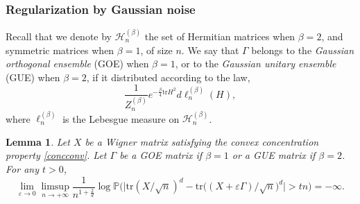 \documentclass[aop,preprint]{imsart}
\newcommand\PP{\mathbb{P}}
\newcommand\tr{\mathrm{tr}}
\newcommand\eps{\varepsilon}
\numberwithin{equation}{section}
\theoremstyle{definition}
\theoremstyle{plain}
\newtheorem{Lem}[Def]{Lemma}
\theoremstyle{remark}
\begin{document}
\subsubsection{Regularization by Gaussian noise}Recall that we denote by $\mathcal{H}_n^{(\beta)}$ the set of Hermitian matrices when $\beta=2 $, and symmetric matrices when $\beta=1$, of size $n$.
We say that $\Gamma$ belongs to the \textit{Gaussian orthogonal ensemble} (GOE) when $\beta=1$, or to the \textit{Gaussian unitary ensemble} (GUE) when $\beta =2$, if it distributed according to the law,
$$ \frac{1}{Z_n^{(\beta)} }e^{-\frac{\beta}{4} \tr H^2 } d \ell_n^{(\beta)}(H),$$
where $\ell_n^{(\beta)}$ is the Lebesgue measure on $\mathcal{H}_n^{(\beta)}$. 
\begin{Lem}Let $X$ be a Wigner matrix satisfying the convex concentration property \ref{concconv}. 
Let $\Gamma$ be a GOE matrix if $\beta=1$ or a GUE matrix if $\beta=2$. For any $t>0$, 
$$ \lim_{\eps \to 0 } \limsup_{n\to +\infty} \frac{1}{n^{1+\frac{2}{d}}} \log \PP\big( \big|  \tr (X/\sqrt{n})^d - \tr\big((X+\eps \Gamma)/\sqrt{n}\big)^d \big|>t n \big) = - \infty.$$
\end{Lem}
\end{document}
